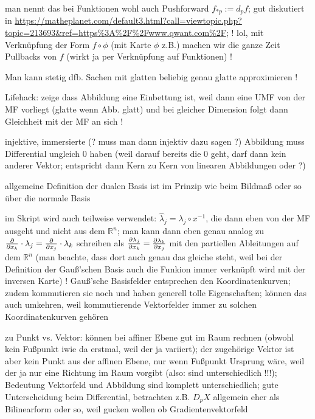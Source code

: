 man nennt das bei Funktionen wohl auch Pushforward $f_{*p} := d_p f$; gut diskutiert in \url{https://matheplanet.com/default3.html?call=viewtopic.php?topic=213693\&ref=https\%3A\%2F\%2Fwww.qwant.com\%2F}; ! lol, mit Verknüpfung der Form $f \circ \phi$ (mit Karte $\phi$ z.B.) machen wir die ganze Zeit Pullbacks von $f$ (wirkt ja per Verknüpfung auf Funktionen) !



Man kann stetig dfb. Sachen mit glatten beliebig genau glatte approximieren !


Lifehack: zeige dass Abbildung eine Einbettung ist, weil dann eine UMF von der MF vorliegt (glatte wenn Abb. glatt) und bei gleicher Dimension folgt dann Gleichheit mit der MF an sich !

injektive, immersierte (? muss man dann injektiv dazu sagen ?) Abbildung muss Differential ungleich 0 haben (weil darauf bereits die 0 geht, darf dann kein anderer Vektor; entspricht dann Kern zu Kern von linearen Abbildungen oder ?)




allgemeine Definition der dualen Basis ist im Prinzip wie beim Bildmaß oder so über die normale Basis

im Skript wird auch teilweise verwendet: $\hat{\lambda}_j = \lambda_j \circ x^{-1}$, die dann eben von der MF ausgeht und nicht aus dem $\mathbb{R}^n$; man kann dann eben genau analog zu $\pdv{x_k} \cdot \lambda_j = \pdv{x_j} \cdot \lambda_k$ schreiben als $\pdv{\lambda_j}{x_k} = \pdv{\lambda_k}{x_j}$ mit den partiellen Ableitungen auf dem $\mathbb{R}^n$ (man beachte, dass dort auch genau das gleiche steht, weil bei der Definition der Gauß'schen Basis auch die Funkion immer verknüpft wird mit der inversen Karte) ! Gauß'sche Basisfelder entsprechen den Koordinatenkurven; zudem kommutieren sie noch und haben generell tolle Eigenschaften; können das auch umkehren, weil kommutierende Vektorfelder immer zu solchen Koordinatenkurven gehören


zu Punkt vs. Vektor: können bei affiner Ebene gut im Raum rechnen (obwohl kein Fußpunkt iwie da erstmal, weil der ja variiert); der zugehörige Vektor ist aber kein Punkt aus der affinen Ebene, nur wenn Fußpunkt Ursprung wäre, weil der ja nur eine Richtung im Raum vorgibt (also: sind unterschiedlich !!!); Bedeutung Vektorfeld und Abbildung sind komplett unterschiedlich; gute Unterscheidung beim Differential, betrachten z.B. $D_p X$ allgemein eher als Bilinearform oder so, weil gucken wollen ob Gradientenvektorfeld

